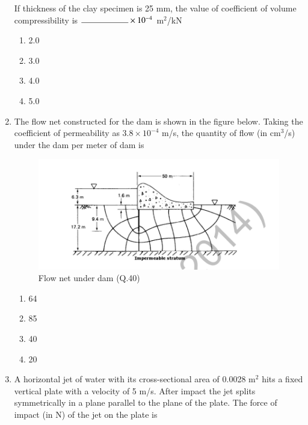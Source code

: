 \documentclass[journal,12pt,onecolumn]{IEEEtran}
\theoremstyle{remark}
\begin{document}
\begin{enumerate}
If thickness of the clay specimen is 25 mm, the value of coefficient of volume compressibility is $\rule{2cm}{0.15mm} \times 10^{-4}$ m$^2$/kN

\begin{multicols}{4}
\begin{enumerate}
\item 2.0
\item 3.0
\item 4.0
\item 5.0
\end{enumerate}
\end{multicols}






\item The flow net constructed for the dam is shown in the figure below. Taking the coefficient of permeability as $3.8 \times 10^{-4}$ m/s, the quantity of flow (in cm$^3$/s) under the dam per meter of dam is \hfill{}

\begin{figure}[H]
\centering
\includegraphics[width=0.92\linewidth]{figs/image14.png}
\caption{Flow net under dam (Q.40)}
\label{fig:q40}
\end{figure}

\begin{multicols}{4}
\begin{enumerate}
\item 64
\item 85
\item 40
\item 20
\end{enumerate}
\end{multicols}

\item A horizontal jet of water with its cross-sectional area of 0.0028 m$^2$ hits a fixed vertical plate with a velocity of 5 m/s. After impact the jet splits symmetrically in a plane parallel to the plane of the plate. The force of impact (in N) of the jet on the plate is \hfill{}


\end{enumerate}
\end{document}
